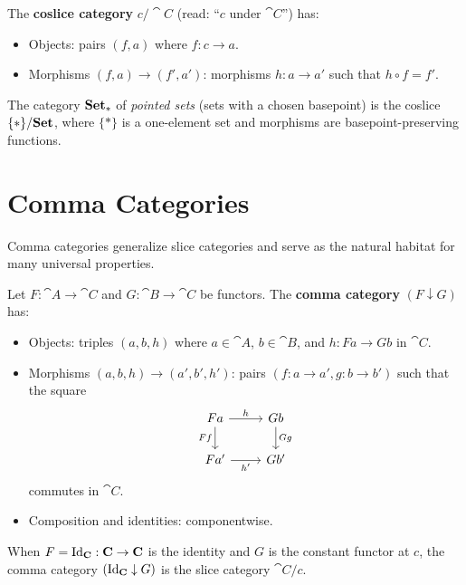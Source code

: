 \begin{definition}
The \textbf{coslice category} $c/\cat{C}$ (read: ``$c$ under $\cat{C}$'') has:
\begin{itemize}
  \item Objects: pairs $(f, a)$ where $f: c \to a$.
  \item Morphisms $(f, a) \to (f', a')$: morphisms $h: a \to a'$ such that $h \circ f = f'$.
\end{itemize}
\end{definition}

\begin{example}
The category $\mathbf{Set}_*$ of \emph{pointed sets} (sets with a chosen basepoint) is the coslice $\{*\}/\mathbf{Set}$, where $\{*\}$ is a one-element set and morphisms are basepoint-preserving functions.
\end{example}

\section{Comma Categories}

Comma categories generalize slice categories and serve as the natural habitat for many universal properties.

\begin{definition}
Let $F: \cat{A} \to \cat{C}$ and $G: \cat{B} \to \cat{C}$ be functors. The \textbf{comma category} $(F \downarrow G)$ has:
\begin{itemize}
  \item Objects: triples $(a, b, h)$ where $a \in \cat{A}$, $b \in \cat{B}$, and $h: Fa \to Gb$ in $\cat{C}$.
  \item Morphisms $(a,b,h) \to (a',b',h')$: pairs $(f: a \to a', g: b \to b')$ such that the square
  \[
    \begin{tikzcd}
      Fa \arrow[r, "h"] \arrow[d, "Ff"'] & Gb \arrow[d, "Gg"] \\
      Fa' \arrow[r, "h'"'] & Gb'
    \end{tikzcd}
  \]
  commutes in $\cat{C}$.
  \item Composition and identities: componentwise.
\end{itemize}
\end{definition}

\begin{example}
When $F = \mathrm{Id}_{\mathbf{C}}: \mathbf{C} \to \mathbf{C}$ is the identity and $G$ is the constant functor at $c$, the comma category $(\mathrm{Id}_{\mathbf{C}} \downarrow G)$ is the slice category $\cat{C}/c$.
\end{example}

